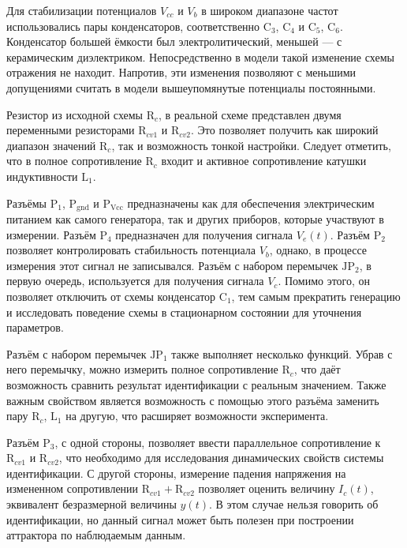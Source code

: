 Для стабилизации потенциалов $V_{cc}$ и $V_b$
в широком диапазоне частот использовались пары конденсаторов, соответственно
$\mathrm{C}_3$, $\mathrm{C}_4$ и
$\mathrm{C}_5$, $\mathrm{C}_6$. Конденсатор большей ёмкости
был электролитический, меньшей --- с керамическим диэлектриком.
Непосредственно в модели такой изменение схемы отражения не находит.
Напротив, эти изменения позволяют с меньшими допущениями считать
в модели вышеупомянутые потенциалы постоянными.

Резистор из исходной схемы $\mathrm{R}_c$,
в реальной схеме представлен двумя переменными резисторами
$\mathrm{R}_{cv1}$ и
$\mathrm{R}_{cv2}$. Это позволяет получить как широкий диапазон значений $\mathrm{R}_c$,
так и возможность тонкой настройки.
Следует отметить, что в полное сопротивление $\mathrm{R}_c$
входит и активное сопротивление катушки индуктивности $\mathrm{L}_{1}$.

Разъёмы $\mathrm{P}_1$, $\mathrm{P}_\mathrm{gnd}$ и $\mathrm{P}_\mathrm{Vcc}$
предназначены как для обеспечения электрическим питанием как самого генератора,
так и других приборов, которые участвуют в измерении.
Разъём $\mathrm{P}_4$ предназначен для получения сигнала $V_e(t)$.
Разъём $\mathrm{P}_2$ позволяет контролировать стабильность
потенциала $V_b$, однако, в процессе измерения этот сигнал не записывался.
Разъём с набором перемычек $\mathrm{JP}_2$, в первую очередь,
используется для получения сигнала $V_c$. Помимо этого,
он позволяет отключить от схемы конденсатор $\mathrm{C}_1$,
тем самым прекратить генерацию и исследовать поведение схемы в стационарном состоянии
для уточнения параметров.

Разъём с набором перемычек $\mathrm{JP}_1$ также выполняет несколько функций.
Убрав с него перемычку, можно измерить полное сопротивление $\mathrm{R}_{c}$,
что даёт возможность сравнить результат идентификации с реальным значением.
Также важным свойством является возможность с помощью этого разъёма
заменить пару $\mathrm{R}_{c}$, $\mathrm{L}_{1}$
на другую, что расширяет возможности эксперимента.

Разъём  $\mathrm{P}_{3}$, с одной стороны, позволяет
ввести параллельное сопротивление к
$\mathrm{R}_{cv1}$ и
$\mathrm{R}_{cv2}$, что необходимо для исследования динамических
свойств системы идентификации. С другой стороны,
измерение падения напряжения на измененном сопротивлении $\mathrm{R}_{cv1} +\mathrm{R}_{cv2}$
позволяет оценить величину $I_c(t)$, эквивалент безразмерной величины $y(t)$.
В этом случае нельзя говорить об идентификации, но данный сигнал может быть полезен
при построении аттрактора по наблюдаемым данным.


